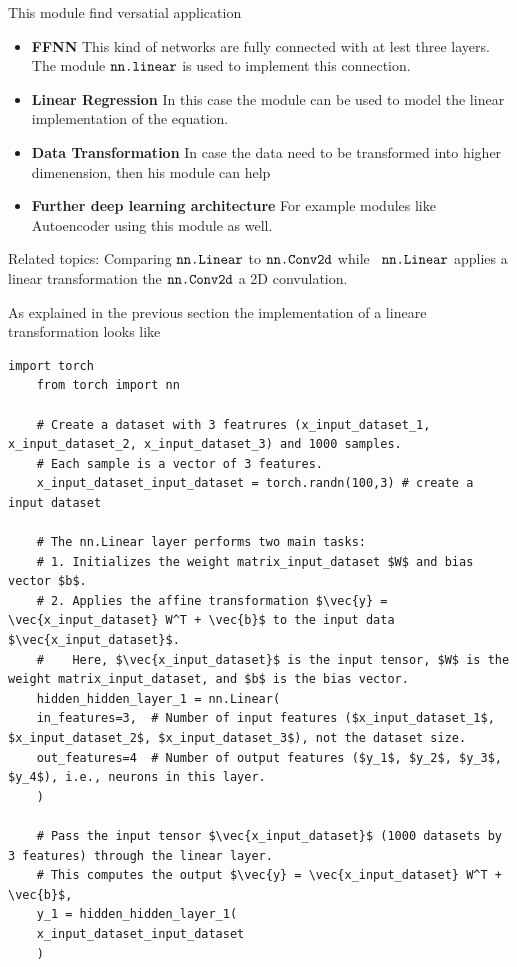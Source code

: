This module find versatial application

\begin{itemize}
	\item \textbf{FFNN} This kind of networks are fully connected with at lest three layers. The module $\verb|nn.linear|$ is used to implement this connection.
	\item \textbf{Linear Regression} In this case the module can be used to model the linear implementation of the equation.
	\item \textbf{Data Transformation} In case the data need to be transformed into higher dimenension, then his module can help
	\item \textbf{Further deep learning architecture} For example modules like Autoencoder using this module as well. 
\end{itemize}

Related topics: Comparing $\verb+nn.Linear+$ to $\verb+nn.Conv2d+$ 
while $\verb+ nn.Linear+$ applies a linear transformation the $\verb+nn.Conv2d+$ a 2D convulation. 

As explained in the previous section the implementation of a lineare transformation looks like

\begin{lstlisting}[language=iPython]
	import torch
	from torch import nn
	
	# Create a dataset with 3 featrures (x_input_dataset_1, x_input_dataset_2, x_input_dataset_3) and 1000 samples.
	# Each sample is a vector of 3 features.
	x_input_dataset_input_dataset = torch.randn(100,3) # create a input dataset
	
	# The nn.Linear layer performs two main tasks:
	# 1. Initializes the weight matrix_input_dataset $W$ and bias vector $b$.
	# 2. Applies the affine transformation $\vec{y} = \vec{x_input_dataset} W^T + \vec{b}$ to the input data $\vec{x_input_dataset}$.
	#    Here, $\vec{x_input_dataset}$ is the input tensor, $W$ is the weight matrix_input_dataset, and $b$ is the bias vector.
	hidden_hidden_layer_1 = nn.Linear(
	in_features=3,  # Number of input features ($x_input_dataset_1$, $x_input_dataset_2$, $x_input_dataset_3$), not the dataset size.
	out_features=4  # Number of output features ($y_1$, $y_2$, $y_3$, $y_4$), i.e., neurons in this layer.
	)
	
	# Pass the input tensor $\vec{x_input_dataset}$ (1000 datasets by 3 features) through the linear layer.
	# This computes the output $\vec{y} = \vec{x_input_dataset} W^T + \vec{b}$,
	y_1 = hidden_hidden_layer_1(
	x_input_dataset_input_dataset
	)
\end{lstlisting}



